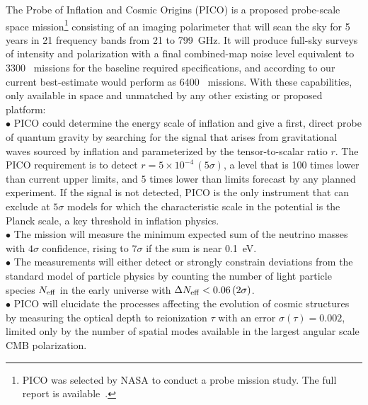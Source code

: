 \documentclass[PICOAPC.tex]{subfiles}
\begin{document}
The Probe of Inflation and Cosmic Origins (PICO) is a proposed probe-scale space mission\footnote{PICO was selected by NASA to conduct a probe mission study. The full report is available~\citep{pico_report,picoweb,nasa_decadalweb}.} consisting of an imaging polarimeter that will scan the sky for 5 years in 21 frequency bands from 21 to 799~GHz. It will produce full-sky surveys of intensity and polarization with a final combined-map noise level equivalent to 3300 \planck\ missions for the baseline required specifications, and according to our current best-estimate would perform as 6400 \planck\ missions. With these capabilities, only available in space and unmatched by any other existing or proposed platform: \\
$\bullet$ PICO could determine the energy scale of inflation and give a first, direct probe of quantum gravity by searching for the signal that arises from gravitational waves sourced by inflation and parameterized by the tensor-to-scalar ratio $r$. The PICO requirement is to detect $r =5\times10^{-4} \, (5\sigma)$, a level that is 100 times lower than current upper limits, and 5 times lower than limits forecast by any planned experiment.  If the signal is not detected, PICO is the only instrument that can exclude at $5 \sigma$ models for which the characteristic scale in the potential is the Planck scale, a key threshold in inflation physics. \\ %
$\bullet$ The mission will measure the minimum expected sum of the neutrino masses with $4\sigma$ confidence, rising to $7\sigma$ if the sum is near 0.1~eV. \\ 
$\bullet$ The measurements will either detect or strongly constrain deviations from the standard model of particle physics by counting the number of light particle species $N_{\rm eff}$ in the early universe with $\Delta N_{\rm eff} < 0.06 \, (2\sigma)$.  \\
$\bullet$ PICO will elucidate the processes affecting the evolution of cosmic structures by measuring the optical depth to reionization $\tau$ with an error $\sigma(\tau) = 0.002$, limited only by the number of spatial modes available in the largest angular scale \ac{CMB} polarization. \\
\end{document}
